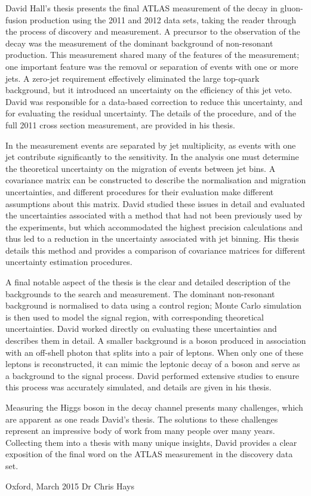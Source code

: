 David Hall's thesis presents the final ATLAS measurement of the \HWW decay in gluon-fusion 
production using the 2011 and 2012 data sets, taking the reader through the process of 
discovery and measurement. A precursor to the observation of the \HWW decay was the 
measurement of the dominant background of non-resonant \WW production. This measurement 
shared many of the features of the \HWW measurement; one important feature was the removal or 
separation of events with one or more jets. A zero-jet requirement effectively eliminated the 
large top-quark background, but it introduced an uncertainty on the efficiency of this jet 
veto. David was responsible for a data-based correction to reduce this uncertainty, and for 
evaluating the residual uncertainty. The details of the procedure, and of the full 2011 \WW 
cross section measurement, are provided in his thesis.

In the \HWW measurement events are separated by jet multiplicity, as events with one jet 
contribute significantly to the sensitivity. In the analysis one must determine the 
theoretical uncertainty on the migration of events between jet bins. A covariance matrix can 
be constructed to describe the normalisation and migration uncertainties, and different 
procedures for their evaluation make different assumptions about this matrix. David studied 
these issues in detail and evaluated the uncertainties associated with a method that had not 
been previously used by the experiments, but which accommodated the highest precision 
calculations and thus led to a reduction in the uncertainty associated with jet binning. His 
thesis details this method and provides a comparison of covariance matrices for different 
uncertainty estimation procedures.

A final notable aspect of the thesis is the clear and detailed description of the backgrounds 
to the \HWW search and measurement. The dominant non-resonant \WW background is normalised to 
data using a control region; Monte Carlo simulation is then used to model the signal region, 
with corresponding theoretical uncertainties. David worked directly on evaluating these 
uncertainties and describes them in detail. A smaller background is a \PW boson produced in 
association with an off-shell photon that splits into a pair of leptons. When only one of 
these leptons is reconstructed, it can mimic the leptonic decay of a \PW boson and serve as a 
background to the signal process. David performed extensive studies to ensure this process 
was accurately simulated, and details are given in his thesis.

Measuring the Higgs boson in the \WW decay channel presents many challenges, which are 
apparent as one reads David's thesis. The solutions to these challenges represent an 
impressive body of work from many people over many years. Collecting them into a thesis with 
many unique insights, David provides a clear exposition of the final word on the ATLAS \HWW 
measurement in the discovery data set.

\vspace{12pt}\noindent
Oxford, March 2015 \hfill Dr Chris Hays
